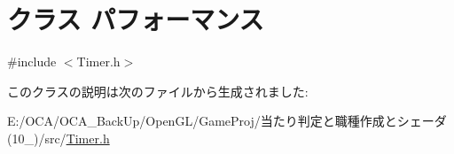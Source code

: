 \hypertarget{class_xE3_x83_x91_xE3_x83_x95_xE3_x82_xA9_xE3_x83_xBC_xE3_x83_x9E_xE3_x83_xB3_xE3_x82_xB9}{\section{クラス パフォーマンス}
\label{class_xE3_x83_x91_xE3_x83_x95_xE3_x82_xA9_xE3_x83_xBC_xE3_x83_x9E_xE3_x83_xB3_xE3_x82_xB9}
}


{\ttfamily \#include $<$Timer.\-h$>$}



このクラスの説明は次のファイルから生成されました\-:\begin{DoxyCompactItemize}
\item 
E\-:/\-O\-C\-A/\-O\-C\-A\-\_\-\-Back\-Up/\-Open\-G\-L/\-Game\-Proj/当たり判定と職種作成とシェーダ(10\-\_)/src/\hyperlink{_timer_8h}{Timer.\-h}\end{DoxyCompactItemize}
